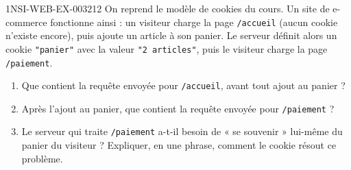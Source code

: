 \begin{exercice}{1NSI-WEB-EX-003}{2}{12}
On reprend le modèle de cookies du cours. Un site de e-commerce fonctionne ainsi : un
visiteur charge la page \lstinline{/accueil} (aucun cookie n'existe encore), puis ajoute un
article à son panier. Le serveur définit alors un cookie \lstinline{"panier"} avec la valeur
\lstinline{"2 articles"}, puis le visiteur charge la page \lstinline{/paiement}.
\begin{enumerate}
  \item Que contient la requête envoyée pour \lstinline{/accueil}, avant tout ajout au panier ?
  \item Après l'ajout au panier, que contient la requête envoyée pour \lstinline{/paiement} ?
  \item Le serveur qui traite \lstinline{/paiement} a-t-il besoin de « se souvenir » lui-même du panier du visiteur ? Expliquer, en une phrase, comment le cookie résout ce problème.
\end{enumerate}
\end{exercice}
